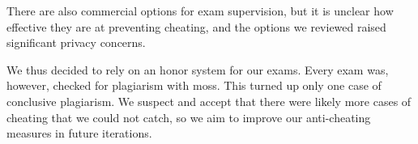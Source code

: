 There are also commercial options for exam supervision, but it is unclear how effective they are at preventing cheating, and the options we reviewed raised significant privacy concerns.

We thus decided to rely on an honor system for our exams. Every exam was, however, checked for plagiarism with moss. This turned up only one case of conclusive plagiarism. We suspect and accept that there were likely more cases of cheating that we could not catch, so we aim to improve our anti-cheating measures in future iterations.
